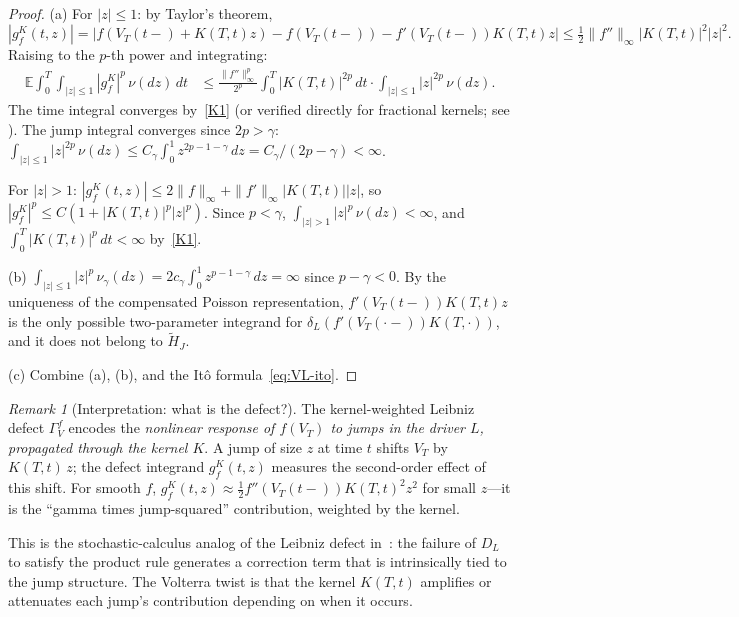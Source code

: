 \documentclass[11pt,a4paper]{article}
\theoremstyle{plain}
\theoremstyle{definition}
\theoremstyle{remark}
\newtheorem{remark}[theorem]{Remark}
\newcommand{\E}{\mathbb{E}}
\begin{document}
\begin{proof}
(a) For $|z| \leq 1$: by Taylor's theorem,
\[
  |g_f^K(t,z)| = |f(V_T(t\!-\!) + K(T,t)z)
  - f(V_T(t\!-\!)) - f'(V_T(t\!-\!))K(T,t)z|
  \leq \tfrac{1}{2}\|f''\|_\infty |K(T,t)|^2 |z|^2.
\]
Raising to the $p$-th power and integrating:
\begin{align*}
  \E\!\int_0^T\!\!\int_{|z|\leq 1}|g_f^K|^p\,\nu(dz)\,dt
  &\leq \frac{\|f''\|_\infty^p}{2^p}
  \int_0^T |K(T,t)|^{2p}\,dt
  \cdot\int_{|z|\leq 1}|z|^{2p}\,\nu(dz).
\end{align*}
The time integral converges by~\ref{K1} (or verified directly for
fractional kernels; see ).  The jump
integral converges since $2p > \gamma$:
$\int_{|z|\leq 1}|z|^{2p}\,\nu(dz)
\leq C_\gamma\int_0^1 z^{2p - 1 - \gamma}\,dz
= C_\gamma/(2p - \gamma) < \infty$.

For $|z| > 1$: $|g_f^K(t,z)| \leq 2\|f\|_\infty
+ \|f'\|_\infty|K(T,t)||z|$, so $|g_f^K|^p \leq
C(1 + |K(T,t)|^p|z|^p)$.  Since $p < \gamma$,
$\int_{|z|>1}|z|^p\,\nu(dz) < \infty$, and
$\int_0^T |K(T,t)|^p\,dt < \infty$ by~\ref{K1}.

(b) $\int_{|z|\leq 1}|z|^p\,\nu_\gamma(dz)
= 2c_\gamma\int_0^1 z^{p-1-\gamma}\,dz = \infty$
since $p - \gamma < 0$.  By the uniqueness of the compensated
Poisson representation, $f'(V_T(t\!-\!))K(T,t)z$ is the only
possible two-parameter integrand for $\delta_L(f'(V_T(\cdot\!-\!))
K(T,\cdot))$, and it does not belong to $\widetilde{H}_J$.

(c) Combine (a), (b), and the It\^o formula~\eqref{eq:VL-ito}.
\end{proof}

\begin{remark}[Interpretation: what is the defect?]
\label{rem:defect-interpret}
The kernel-weighted Leibniz defect $\Gamma_V^f$ encodes the
\emph{nonlinear response of $f(V_T)$ to jumps in the driver $L$,
propagated through the kernel $K$}.  A jump of size $z$ at time $t$
shifts $V_T$ by $K(T,t)\,z$; the defect integrand $g_f^K(t,z)$
measures the second-order effect of this shift.  For smooth $f$,
$g_f^K(t,z) \approx \frac{1}{2}f''(V_T(t\!-\!))K(T,t)^2 z^2$
for small $z$---it is the ``gamma times jump-squared'' contribution,
weighted by the kernel.

This is the stochastic-calculus analog of the Leibniz defect
in~\cite{Fontes2026d}: the failure of $D_L$ to satisfy the
product rule generates a correction term that is intrinsically
tied to the jump structure.  The Volterra twist is that the kernel
$K(T,t)$ amplifies or attenuates each jump's contribution depending
on when it occurs.
\end{remark}
\end{document}
